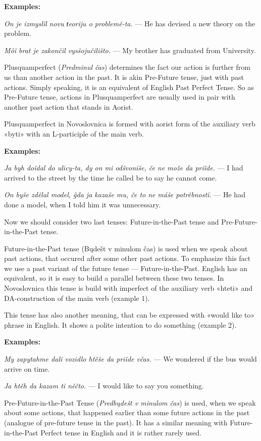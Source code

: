\textbf{Examples:}

\textit{On je izmyslïl novu ŧeoriju o problemě-ta.} — He has devised a new theory on the problem.

\textit{Môǐ brat je zakončil vysšojučilišto.} — My brother has graduated from University.

Plusquamperfect (\textit{Predminul čas}) determines the fact our action is further from us than another action in the past. It is akin Pre-Future tense, just with past actions. Simply speaking, it is an equivalent of English Past Perfect Tense. So as Pre-Future tense, actions in Plusquamperfect are usually used in pair with another past action that stands in Aorist.

Plusquamperfect in Novoslovnica is formed with aorist form of the auxiliary verb «byti» with an L-participle of the main verb.

\textbf{Examples:}

\textit{Ja byh doǐdal do ulicy-ta, dy on mi odŝvoniše, če ne može da priǐde.} — I had arrived to the street by the time he called be to say he cannot come.

\textit{On byše zdělal model, ĝda ja kazaše mu, če to ne máše potrěbnostï.} — He had done a model, when I told him it was unnecessary. 

Now we should consider two last tenses: Future-in-the-Past tense and Pre-Future-in-the-Past tense.

Future-in-the-Past tense (Bųdešt v minulom čas) is used when we speak about past actions, that occured after some other past actions. To emphasize this fact we use a past variant of the future tense — Future-in-the-Past. English has an equivalent, so it is easy to build a parallel between these two tenses. In Novoslovnica this tense is build with imperfect of the auxiliary verb «hteti» and DA-construction of the main verb (example 1).

This tense has also another meaning, that can be expressed with «would like to» phrase in English. It shows a polite intention to do something (example 2).

\textbf{Examples:}

\textit{My zapytahme dali vozidlo htěše da priǐde včas.} — We wondered if the bus would arrive on time.

\textit{Ja htěh da kazam ti něčto.} — I would like to say you something.

Pre-Future-in-the-Past Tense (\textit{Predbųdešt v minulom čas}) is used, when we speak about some actions, that happened earlier than some future actions in the past (analogue of pre-future tense in the past). It has a similar meaning with Future-in-the-Past Perfect tense in English and it is rather rarely used.

